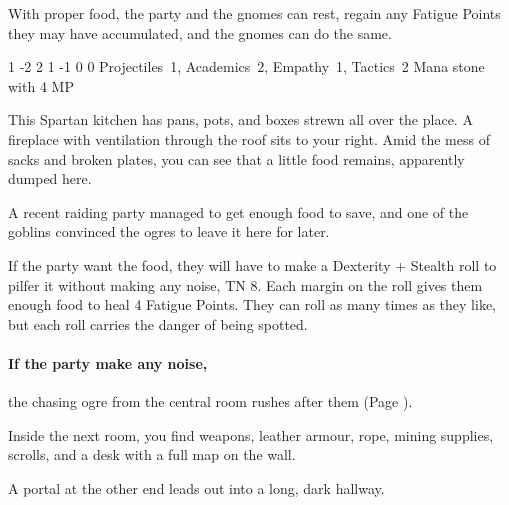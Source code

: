 \begin{multicols}{2}
With proper food, the party and the gnomes can rest, regain any Fatigue Points they may have accumulated, and the gnomes can do the same.




{1}%
{-2}%
{{2}%
{1}%
{-1}}%
{0}%
{0}%
{Projectiles~1, Academics~2, Empathy~1, Tactics~2
\knacks{\alchemist}
}%
{Mana stone with 4 MP}%
{\addtocounter{sp}{8}}


\begin{boxtext}

  This Spartan kitchen has pans, pots, and boxes strewn all over the place.
  A fireplace with ventilation through the roof sits to your right.
  Amid the mess of sacks and broken plates, you can see that a little food remains, apparently dumped here.

\end{boxtext}

A recent raiding party managed to get enough food to save, and one of the goblins convinced the ogres to leave it here for later.

If the party want the food, they will have to make a Dexterity + Stealth roll to pilfer it without making any noise, TN 8.
Each margin on the roll gives them enough food to heal 4 Fatigue Points.
They can roll as many times as they like, but each roll carries the danger of being spotted.

\paragraph{If the party make any noise,}
the chasing ogre from the central room rushes after them (Page \pageref{chasingogre}).


\begin{boxtext}

  Inside the next room, you find weapons, leather armour, rope, mining supplies, scrolls, and a desk with a full map on the wall.

  A portal at the other end leads out into a long, dark hallway.


\end{boxtext}
\end{multicols}
